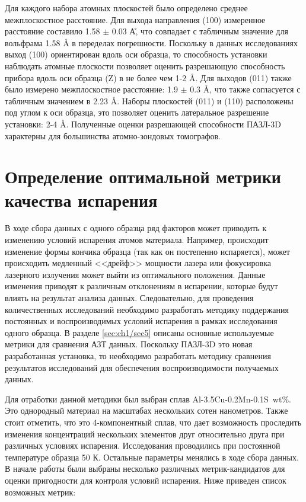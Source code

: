 Для каждого набора атомных плоскостей было определено среднее межплоскостное расстояние. Для выхода направления (100) измеренное расстояние составило 1.58 $\pm$ 0.03 \r{А}, что совпадает с табличным значение для вольфрама 1.58 \r{A} в переделах погрешности. Поскольку в данных исследованиях выход (100) ориентирован вдоль оси образца, то способность установки наблюдать атомные плоскости позволяет оценить разрешающую способность прибора вдоль оси образца (Z) в не более чем 1-2 \r{A}. Для выходов (011) также было измерено межплоскостное расстояние: 1.9 $\pm$ 0.3 \r{A}, что также согласуется с табличным значением в 2.23 \r{A}. Наборы плоскостей (011) и (110) расположены под углом к оси образца, это позволяет оценить латеральное разрешение установки: 2-4 \r{A}. Полученные оценки разрешающей способности ПАЗЛ-3D  характерны для большинства атомно-зондовых томографов. 

\FloatBarrier

\section{Определение оптимальной метрики качества испарения}\label{sec:ch3/sect3}

В ходе сбора данных с одного образца ряд факторов может приводить к изменению условий испарения атомов материала. Например, происходит изменение формы кончика образца (так как он постепенно испаряется), может происходить медленный <<дрейф>>  мощности лазера или фокусировка лазерного излучения может выйти из оптимального положения. Данные изменения приводят к различным отклонениям в испарении, которые будут влиять на результат анализа данных. Следовательно, для проведения количественных исследований необходимо разработать методику поддержания постоянных и воспроизводимых условий испарения в рамках исследования одного образца. В разделе \cref{sec:ch1/sec5} описаны основные используемые метрики для сравнения АЗТ данных. Поскольку ПАЗЛ-3D это новая разработанная установка, то необходимо разработать методику сравнения результатов исследований для обеспечения воспроизводимости получаемых данных.

Для отработки данной методики был выбран сплав Al-3.5Cu-0.2Mn-0.1S~wt\%. Это однородный материал на масштабах нескольких сотен нанометров. Также стоит отметить, что это 4-компонентный сплав, что дает возможность проследить изменения концентраций нескольких элементов друг относительно друга при различных условиях испарения. Исследования проводились при постоянной температуре образца 50 К. Остальные параметры менялись в ходе сбора данных. В начале работы были выбраны несколько различных метрик-кандидатов для оценки пригодности для контроля условий испарения. Ниже приведен список возможных метрик:

